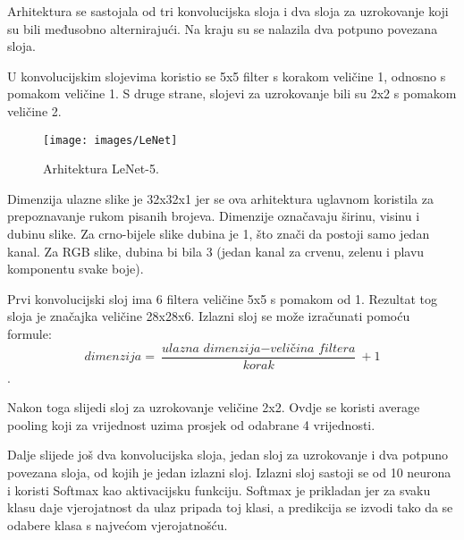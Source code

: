 Arhitektura se sastojala od tri konvolucijska sloja i dva sloja za uzrokovanje koji su bili međusobno alternirajući. Na kraju su se nalazila dva potpuno povezana sloja.

U konvolucijskim slojevima koristio se 5x5 filter s korakom veličine 1, odnosno s pomakom veličine 1. S druge strane, slojevi za uzrokovanje bili su 2x2 s pomakom veličine 2.
\begin{figure}[h]
    \centering
    \texttt{[image: images/LeNet]}
    \caption{Arhitektura LeNet-5.}
    \label{fig:slika8}
\end{figure}
Dimenzija ulazne slike je 32x32x1 jer se ova arhitektura uglavnom koristila za prepoznavanje rukom pisanih brojeva. Dimenzije označavaju širinu, visinu i dubinu slike. Za crno-bijele slike dubina je 1, što znači da postoji samo jedan kanal. Za RGB slike, dubina bi bila 3 (jedan kanal za crvenu, zelenu i plavu komponentu svake boje).

Prvi konvolucijski sloj ima 6 filtera veličine 5x5 s pomakom od 1.
Rezultat tog sloja je značajka veličine 28x28x6.
Izlazni sloj se može izračunati pomoću formule: \[ \textit{dimenzija} = \frac{\textit{ulazna dimenzija} - \textit{veličina filtera}}{\textit{korak}} + 1 \].

Nakon toga slijedi sloj za uzrokovanje veličine 2x2.
Ovdje se koristi average pooling koji za vrijednost uzima prosjek od odabrane 4 vrijednosti.

Dalje slijede još dva konvolucijska sloja, jedan sloj za uzrokovanje i dva potpuno povezana sloja, od kojih je jedan izlazni sloj.
Izlazni sloj sastoji se od 10 neurona i koristi Softmax kao aktivacijsku funkciju.
Softmax je prikladan jer za svaku klasu daje vjerojatnost da ulaz pripada toj klasi, a predikcija se izvodi tako da se odabere klasa s najvećom vjerojatnošću.

